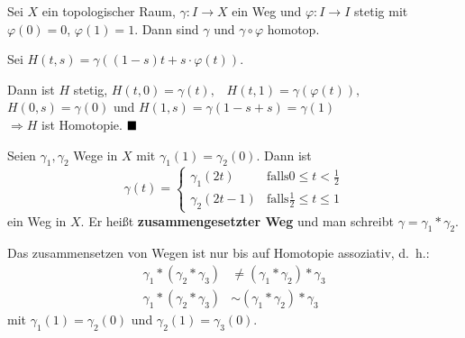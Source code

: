 \begin{korollar}\label{kor:homotope-wege}
    Sei $X$ ein topologischer Raum, $\gamma: I \rightarrow X$ ein 
    Weg und $\varphi: I \rightarrow I$ stetig mit $\varphi(0) = 0$,
    $\varphi(1) = 1$. Dann sind $\gamma$ und $\gamma \circ \varphi$
    homotop.
\end{korollar}

\begin{beweis}
    Sei $H (t,s) = \gamma ((1-s) t + s \cdot \varphi(t))$.

    Dann ist $H$ stetig, $H(t,0) = \gamma(t),\;\;\; H(t,1) = \gamma ( \varphi(t)),\;\;\;$
    $H(0,s) = \gamma(0)$ und $H(1,s) = \gamma(1-s+s) = \gamma(1)$\\
    $\Rightarrow H$ ist Homotopie. $\qed$
\end{beweis}

\begin{definition}
    Seien $\gamma_1, \gamma_2$ Wege in $X$ mit $\gamma_1(1) = \gamma_2(0)$.
    Dann ist 
    \[\gamma (t) = \begin{cases}
        \gamma_1(2t)   &\text{falls} 0 \leq t < \frac{1}{2}\\
        \gamma_2(2t-1) &\text{falls} \frac{1}{2} \leq t \leq 1
      \end{cases}\]
    ein Weg in $X$. Er heißt \textbf{zusammengesetzter Weg} und man
    schreibt $\gamma = \gamma_1 * \gamma_2$.
\end{definition}

\begin{korollar}\label{kor:assoziativitaet-von-zusammensetzen-von-wegen}
    Das zusammensetzen von Wegen ist nur bis auf 
    Homotopie assoziativ, d.~h.:
    \begin{align*}
        \gamma_1 * (\gamma_2 * \gamma_3) &\neq (\gamma_1 * \gamma_2) * \gamma_3\\
        \gamma_1 * (\gamma_2 * \gamma_3) &\sim (\gamma_1 * \gamma_2) * \gamma_3
    \end{align*}
    mit $\gamma_1(1)=\gamma_2(0)$ und $\gamma_2(1) = \gamma_3(0)$.
\end{korollar}

